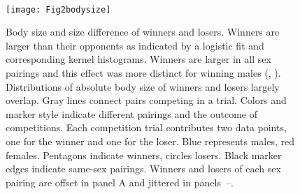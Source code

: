 \begin{figure}[t]
  \begin{minipage}[t]{0.5\textwidth}\mbox{}\\[-2ex]  
    \centerline{\texttt{[image: Fig2bodysize]}}
  \end{minipage}
  \hfill
  \begin{minipage}[t]{0.45\textwidth}
  \caption{\label{bodysize} 
  Body size and size difference of winners and losers.  Winners are larger than their opponents as indicated by a logistic fit and corresponding kernel histograms.  Winners are larger in all sex pairings and this effect was more distinct for winning males (, ).  Distributions of absolute body size of winners and losers largely overlap. Gray lines connect pairs competing in a trial. Colors and marker style indicate different pairings and the outcome of competitions. Each competition trial contributes two data points, one for the winner and one for the loser. Blue represents males, red females. Pentagons indicate winners, circles losers. Black marker edges indicate same-sex pairings. Winners and losers of each sex pairing are offset in panel A and jittered in panels~--.}
  \end{minipage}
\end{figure}


